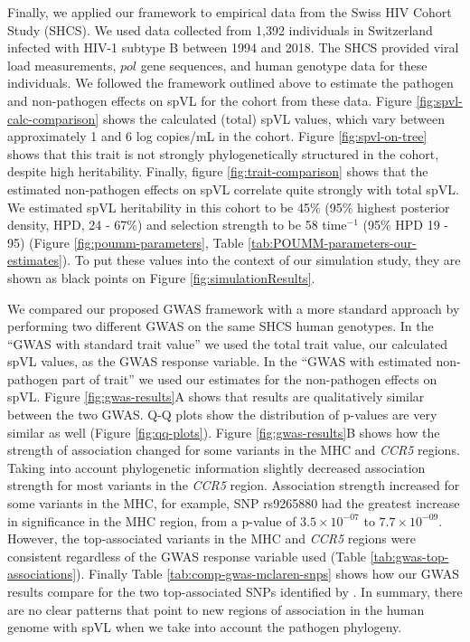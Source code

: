 \documentclass[11pt]{article}
\begin{document}
\begin{linenumbers}
Finally, we applied our framework to empirical data from the Swiss HIV Cohort Study (SHCS). We used data collected from 1,392 individuals in Switzerland infected with HIV-1 subtype B between 1994 and 2018. The SHCS provided viral load measurements, $pol$ gene sequences, and human genotype data for these individuals. We followed the framework outlined above to estimate the pathogen and non-pathogen effects on spVL for the cohort from these data. Figure \ref{fig:spvl-calc-comparison} shows the calculated (total) spVL values, which vary between approximately 1 and 6 log copies/mL in the cohort.  Figure \ref{fig:spvl-on-tree} shows that this trait is not strongly phylogenetically structured in the cohort, despite high heritability. Finally, figure \ref{fig:trait-comparison} shows that the estimated non-pathogen effects on spVL correlate quite strongly with total spVL. We estimated spVL heritability in this cohort to be 45\% (95\% highest posterior density, HPD, 24 - 67\%) and selection strength to be 58 time$^{-1}$ (95\% HPD 19 - 95) (Figure \ref{fig:poumm-parameters}, Table \ref{tab:POUMM-parameters-our-estimates}). To put these values into the context of our simulation study, they are shown as black points on Figure \ref{fig:simulationResults}.

We compared our proposed GWAS framework with a more standard approach by performing two different GWAS on the same SHCS human genotypes. In the ``GWAS with standard trait value'' we used the total trait value, our calculated spVL values, as the GWAS response variable. In the ``GWAS with estimated non-pathogen part of trait'' we used our estimates for the non-pathogen effects on spVL. Figure \ref{fig:gwas-results}A shows that results are qualitatively similar between the two GWAS. Q-Q plots show the distribution of p-values are very similar as well (Figure \ref{fig:qq-plots}). Figure \ref{fig:gwas-results}B shows how the strength of association changed for some variants in the MHC and \emph{CCR5} regions. Taking into account phylogenetic information slightly decreased association strength for most variants in the \emph{CCR5} region. Association strength increased for some variants in the MHC, for example, SNP rs9265880 had the greatest increase in significance in the MHC region, from a p-value of $3.5 \times 10^{-07}$ to $7.7 \times 10^{-09}$. However, the top-associated variants in the MHC and \emph{CCR5} regions were consistent regardless of the GWAS response variable used (Table \ref{tab:gwas-top-associations}). Finally Table \ref{tab:comp-gwas-mclaren-snps} shows how our GWAS results compare for the two top-associated SNPs identified by \citet{McLaren2015}. In summary, there are no clear patterns that point to new regions of association in the human genome with spVL when we take into account the pathogen phylogeny.


\end{linenumbers}
\end{document}

